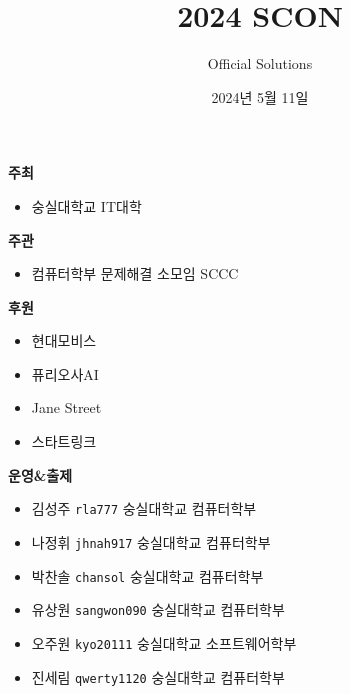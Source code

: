 
\usetikzlibrary{arrows.meta,matrix,decorations.pathreplacing}

\title{2024 SCON}
\subtitle{}
\author{Official Solutions}
\date{2024년 5월 11일}


    \setcounter{framenumber}{-1}
    \frame{\titlepage}

    \begin{frame} %
        \textbf{주최} %
        \begin{itemize}
            \item 숭실대학교 IT대학
        \end{itemize}
        \vspace{3mm}
        \textbf{주관} %
        \begin{itemize}
            \item 컴퓨터학부 문제해결 소모임 SCCC
        \end{itemize}
        \vspace{3mm}
        \textbf{후원} %
        \begin{itemize}
            \item 현대모비스
            \item 퓨리오사AI
            \item Jane Street
            \item 스타트링크
        \end{itemize}
    \end{frame}
    
    \begin{frame}
        \textbf{운영\&출제} %
        \begin{itemize}
            \item 김성주 \tabto{1.5cm} \texttt{rla777} \tabto{8cm} {\color{gray} 숭실대학교 컴퓨터학부}
            \item 나정휘 \tabto{1.5cm} \texttt{jhnah917} \tabto{4cm} {\color{gray} } \tabto{8cm} {\color{gray} 숭실대학교 컴퓨터학부}
            \item 박찬솔 \tabto{1.5cm} \texttt{chansol} \tabto{4cm} {\color{gray} } \tabto{8cm} {\color{gray} 숭실대학교 컴퓨터학부}
            \item 유상원 \tabto{1.5cm} \texttt{sangwon090} \tabto{4cm} {\color{gray} } \tabto{8cm} {\color{gray} 숭실대학교 컴퓨터학부}
            \item 오주원 \tabto{1.5cm} \texttt{kyo20111} \tabto{4cm} {\color{gray} } \tabto{8cm} {\color{gray} 숭실대학교 소프트웨어학부}
            \item 진세림 \tabto{1.5cm} \texttt{qwerty1120} \tabto{8cm} {\color{gray} 숭실대학교 컴퓨터학부}
        \end{itemize}
        \vspace{3mm}
    \end{frame}

